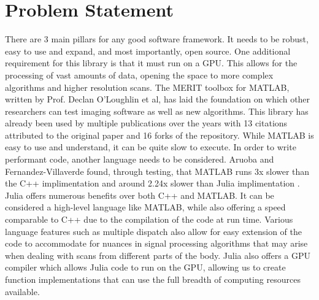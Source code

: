 \section*{Problem Statement}
There are 3 main pillars for any good software framework. It needs to be robust, easy to use and expand, and most importantly, open source. One additional requirement for this library is that it must run on a GPU. This allows for the processing of vast amounts of data, opening the space to more complex algorithms and higher resolution scans. The MERIT toolbox for MATLAB, written by Prof. Declan O'Loughlin et al, has laid the foundation on which other researchers can test imaging software as well as new algorithms. This library has already been used by multiple publications over the years with 13 citations attributed to the original paper and 16 forks of the repository. While MATLAB is easy to use and understand, it can be quite slow to execute. In order to write performant code, another language needs to be considered. Aruoba and Fernandez-Villaverde found, through testing, that MATLAB runs 3x slower than the C++ implimentation and around 2.24x slower than Julia implimentation \cite{RN3}. Julia offers numerous benefits over both C++ and MATLAB. It can be considered a high-level language like MATLAB, while also offering a speed comparable to C++ due to the compilation of the code at run time. Various language features such as multiple dispatch also allow for easy extension of the code to accommodate for nuances in signal processing algorithms that may arise when dealing with scans from different parts of the body. Julia also offers a GPU compiler which allows Julia code to run on the GPU, allowing us to create function implementations that can use the full breadth of computing resources available.